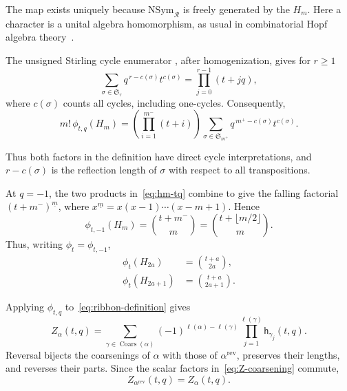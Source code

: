 \documentclass{amsart}
\theoremstyle{definition}
\theoremstyle{remark}
\begin{document}
The map exists uniquely because \(\mathrm{NSym}_{\mathcal R}\) is freely generated by
the \(H_m\).  Here a character is a unital algebra homomorphism, as usual in
combinatorial Hopf algebra theory~\cite{AguiarBergeronSottile}.

The unsigned Stirling cycle enumerator
\cite[Section~1.3]{StanleyEC1}, after homogenization, gives for $r\geq1$
\begin{equation}
 \sum_{\sigma\in\mathfrak S_r}
 q^{\,r-c(\sigma)}t^{c(\sigma)}
 =\prod_{j=0}^{r-1}(t+jq),
 \label{eq:cycle-expansion}
\end{equation}
where \(c(\sigma)\) counts all cycles, including one-cycles.  Consequently,
\begin{equation*}
 m!\,\phi_{t,q}(H_m)
 =\left(\prod_{i=1}^{m^-}(t+i)\right)
  \sum_{\sigma\in\mathfrak S_{m^+}}
  q^{\,m^+-c(\sigma)}t^{c(\sigma)}.
\end{equation*}

Thus both factors in the definition have direct cycle interpretations, and
$r-c(\sigma)$ is the reflection length of $\sigma$ with respect to all
transpositions.

At \(q=-1\), the two products in~\eqref{eq:hm-tq} combine to give
the falling factorial $(t+m^-)^{\underline m}$, where
$x^{\underline m}=x(x-1)\cdots(x-m+1)$.  Hence
\begin{equation*}
 \phi_{t,-1}(H_m)
 =\binom{t+m^-}{m}
 =\binom{t+\lfloor m/2\rfloor}{m}.
\end{equation*}
Thus, writing \(\phi_t=\phi_{t,-1}\),
\begin{align}
 \phi_t(H_{2a})&=\binom{t+a}{2a},
 \label{eq:even-kernel}\\
 \phi_t(H_{2a+1})&=\binom{t+a}{2a+1}.
 \label{eq:odd-kernel}
\end{align}

Applying \(\phi_{t,q}\) to~\eqref{eq:ribbon-definition} gives
\begin{equation}
 Z_\alpha(t,q)
 =\sum_{\gamma\in\operatorname{Coars}(\alpha)}
  (-1)^{\ell(\alpha)-\ell(\gamma)}
  \prod_{j=1}^{\ell(\gamma)}\mathsf h_{\gamma_j}(t,q).
 \label{eq:Z-coarsening}
\end{equation}
Reversal bijects the coarsenings of \(\alpha\) with those of
\(\alpha^{\mathrm{rev}}\), preserves their lengths, and reverses their parts.
Since the scalar factors in~\eqref{eq:Z-coarsening} commute,
\begin{equation}
 Z_{\alpha^{\mathrm{rev}}}(t,q)=Z_\alpha(t,q).
 \label{eq:reversal-invariance}
\end{equation}
\end{document}
